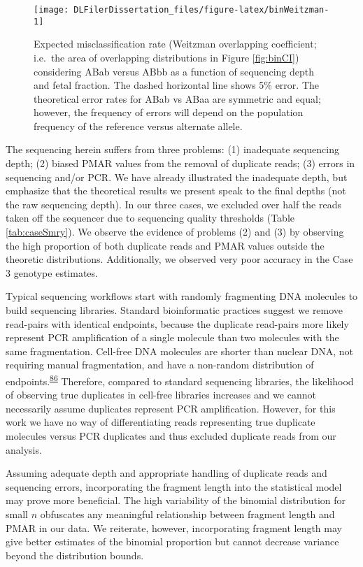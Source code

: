 \documentclass[11pt,letterpaper]{book}
\begin{document}
\begin{figure}

{\centering \texttt{[image: DLFilerDissertation\_files/figure-latex/binWeitzman-1]} 

}

\caption[(ref:binWeitzmanScap)]{Expected misclassification rate (Weitzman overlapping coefficient; i.e.~the area of overlapping distributions in Figure \ref{fig:binCI}) considering ABab versus ABbb as a function of sequencing depth and fetal fraction. The dashed horizontal line shows 5\% error. The theoretical error rates for ABab vs ABaa are symmetric and equal; however, the frequency of errors will depend on the population frequency of the reference versus alternate allele.}\label{fig:binWeitzman}
\end{figure}

The sequencing herein suffers from three problems: (1) inadequate sequencing depth; (2) biased PMAR values from the removal of duplicate reads; (3) errors in sequencing and/or PCR.
We have already illustrated the inadequate depth, but emphasize that the theoretical results we present speak to the final depths (not the raw sequencing depth).
In our three cases, we excluded over half the reads taken off the sequencer due to sequencing quality thresholds (Table \ref{tab:caseSmry}).
We observe the evidence of problems (2) and (3) by observing the high proportion of both duplicate reads and PMAR values outside the theoretic distributions.
Additionally, we observed very poor accuracy in the Case 3 genotype estimates.

Typical sequencing workflows start with randomly fragmenting DNA molecules to build sequencing libraries.
Standard bioinformatic practices suggest we remove read-pairs with identical endpoints, because the duplicate read-pairs more likely represent PCR amplification of a single molecule than two molecules with the same fragmentation.
Cell-free DNA molecules are shorter than nuclear DNA, not requiring manual fragmentation, and have a non-random distribution of endpoints.\textsuperscript{\protect\hyperlink{ref-chan:2016aa}{86}}
Therefore, compared to standard sequencing libraries, the likelihood of observing true duplicates in cell-free libraries increases and we cannot necessarily assume duplicates represent PCR amplification.
However, for this work we have no way of differentiating reads representing true duplicate molecules versus PCR duplicates and thus excluded duplicate reads from our analysis.

Assuming adequate depth and appropriate handling of duplicate reads and sequencing errors, incorporating the fragment length into the statistical model may prove more beneficial.
The high variability of the binomial distribution for small \(n\) obfuscates any meaningful relationship between fragment length and PMAR in our data.
We reiterate, however, incorporating fragment length may give better estimates of the binomial proportion but cannot decrease variance beyond the distribution bounds.
\end{document}
